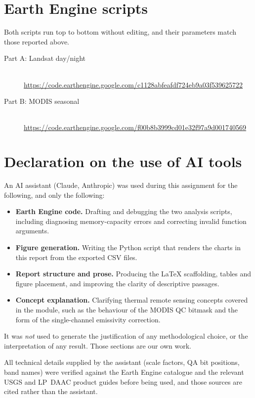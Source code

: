 \documentclass[11pt,a4paper]{article}
\begin{document}
\appendix
\section{Earth Engine scripts}

Both scripts run top to bottom without editing, and their parameters
match those reported above.

\begin{description}
  \item[Part A: Landsat day/night]\hfill \\
    \url{https://code.earthengine.google.com/c1128abfeafdf724eb9a03f539625722}
  \item[Part B: MODIS seasonal]\hfill \\
    \url{https://code.earthengine.google.com/f00b8b3999cd01e32f97a9d001740569}
\end{description}

\section{Declaration on the use of AI tools}

An AI assistant (Claude, Anthropic) was used during this assignment
for the following, and only the following:

\begin{itemize}
  \item \textbf{Earth Engine code.} Drafting and debugging the two
        analysis scripts, including diagnosing memory-capacity errors
        and correcting invalid function arguments.
  \item \textbf{Figure generation.} Writing the Python script that
        renders the charts in this report from the exported CSV files.
  \item \textbf{Report structure and prose.} Producing the
        \LaTeX{} scaffolding, tables and figure placement, and
        improving the clarity of descriptive passages.
  \item \textbf{Concept explanation.} Clarifying thermal remote
        sensing concepts covered in the module, such as the behaviour
        of the MODIS QC bitmask and the form of the single-channel
        emissivity correction.
\end{itemize}

It was \emph{not} used to generate the justification of any
methodological choice, or the interpretation of any result. Those
sections are our own work.

All technical details supplied by the assistant (scale factors, QA
bit positions, band names) were verified against the Earth Engine
catalogue and the relevant USGS and LP~DAAC product guides before
being used, and those sources are cited rather than the assistant.
\end{document}
